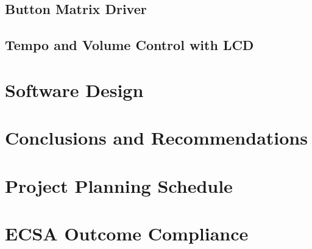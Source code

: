 \documentclass[12pt,a4paper]{report}
\begin{document}
\section{Button Matrix Driver}
\section{Tempo and Volume Control with LCD}

\chapter{Software Design}

\chapter{Conclusions and Recommendations}

\printbibliography


\appendix
\chapter{Project Planning Schedule}

\chapter{ECSA Outcome Compliance}
\end{document}
